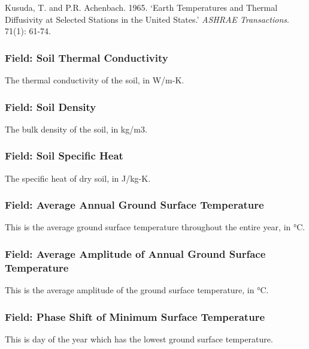 Kusuda, T. and P.R. Achenbach. 1965. `Earth Temperatures and Thermal Diffusivity at Selected Stations in the United States.' \emph{ASHRAE Transactions}. 71(1): 61-74.

\subsubsection{Field: Soil Thermal Conductivity}\label{field-soil-thermal-conductivity-1}

The thermal conductivity of the soil, in W/m-K.

\subsubsection{Field: Soil Density}\label{field-soil-density-1}

The bulk density of the soil, in kg/m3.

\subsubsection{Field: Soil Specific Heat}\label{field-soil-specific-heat-1}

The specific heat of dry soil, in J/kg-K.

\subsubsection{Field: Average Annual Ground Surface Temperature}\label{field-average-annual-ground-surface-temperature}

This is the average ground surface temperature throughout the entire year, in \si{\degreeCelsius}.

\subsubsection{Field: Average Amplitude of Annual Ground Surface Temperature}\label{field-average-amplitude-of-annual-ground-surface-temperature}

This is the average amplitude of the ground surface temperature, in \si{\degreeCelsius}.

\subsubsection{Field: Phase Shift of Minimum Surface Temperature}\label{field-phase-shift-of-minimum-surface-temperature}

This is day of the year which has the lowest ground surface temperature.

